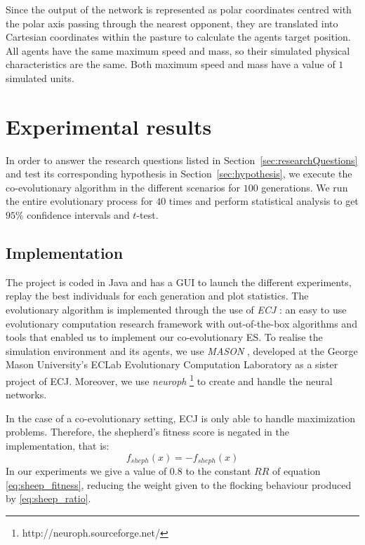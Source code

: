 \documentclass[conference]{IEEEtran}
\begin{document}
Since the output of the network is represented as polar coordinates centred with the polar axis passing through the nearest opponent, they are translated into Cartesian coordinates within the pasture to calculate the agents target position.
All agents have the same maximum speed and mass, so their simulated physical characteristics are the same.
Both maximum speed and mass have a value of $1$ simulated units.



\section{Experimental results}
\label{sec:experiment}
In order to answer the research questions listed in {Section~\ref{sec:researchQuestions}} and test its corresponding hypothesis in {Section~\ref{sec:hypothesis}}, we execute the co-evolutionary algorithm in the different scenarios for $100$ generations. 
We run the entire evolutionary process for $40$ times and perform statistical analysis to get $95\%$ confidence intervals and $t$-test.

\subsection{Implementation}
\label{sec:implementation}
The project is coded in Java and has a GUI to launch the different experiments, replay the best individuals for each generation and plot statistics.
The evolutionary algorithm is implemented through the use of \textit{ECJ} \cite{luke2006ecj}: an easy to use evolutionary computation research framework with out-of-the-box algorithms and tools that enabled us to implement our co-evolutionary ES.
To realise the simulation environment and its agents, we use \textit{MASON} \cite{luke2005mason}, developed at the George Mason University's ECLab Evolutionary Computation Laboratory as a sister project of ECJ.
Moreover, we use \textit{neuroph} \footnote{http://neuroph.sourceforge.net/} to create and handle the neural networks.

In the case of a co-evolutionary setting, ECJ is only able to handle maximization problems. Therefore, the shepherd's fitness score is negated in the implementation, that is:
$$ f_{sheph}(x) = -f_{sheph}(x) $$
In our experiments we give a value of $0.8$ to the constant $RR$ of equation \eqref{eq:sheep_fitness}, reducing the weight given to the flocking behaviour produced by \eqref{eq:sheep_ratio}.
\end{document}
